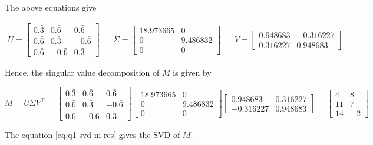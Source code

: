 The above equations give

\begin{align}
    U = \begin{bmatrix}
        0.\bar{3} & 0.\bar{6} & 0.\bar{6} \\
        0.\bar{6} & 0.\bar{3} & -0.\bar{6} \\
        0.\bar{6} & -0.\bar{6} & 0.\bar{3}
        \end{bmatrix}
    &&
    \Sigma = \begin{bmatrix}
        18.973665 & 0 \\
        0 & 9.486832 \\
        0 & 0
        \end{bmatrix}
    &&
    V = \begin{bmatrix}
        0.948683 & -0.316227 \\
        0.316227 & 0.948683
        \end{bmatrix}
    \label{eq:q1-svd-m-res}
\end{align}

Hence, the singular value decomposition of $M$ is given by

\begin{equation}
    M = U \Sigma V^\top = \begin{bmatrix}
        0.\bar{3} & 0.\bar{6} & 0.\bar{6} \\
        0.\bar{6} & 0.\bar{3} & -0.\bar{6} \\
        0.\bar{6} & -0.\bar{6} & 0.\bar{3}
        \end{bmatrix} \begin{bmatrix}
        18.973665 & 0 \\
        0 & 9.486832 \\
        0 & 0
        \end{bmatrix} \begin{bmatrix}
        0.948683 & 0.316227 \\
        -0.316227 & 0.948683
        \end{bmatrix} = \begin{bmatrix}
        4 & 8 \\
        11 & 7 \\
        14 & -2
        \end{bmatrix}
    \nonumber
\end{equation}

The equation \ref{eq:q1-svd-m-res} gives the SVD of $M$.
